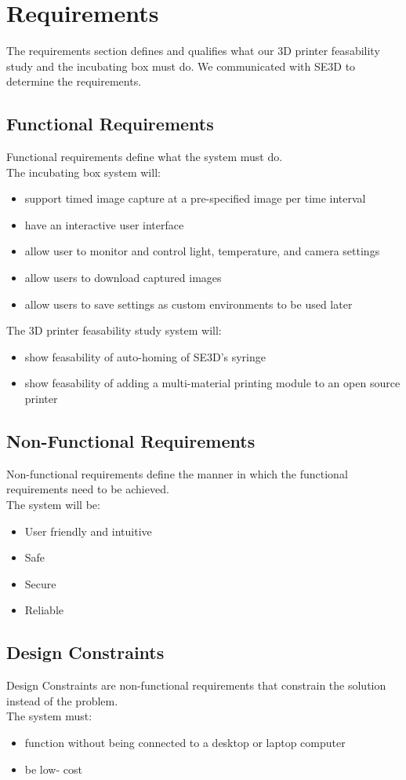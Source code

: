 \chapter{Requirements}

The requirements section defines and qualifies what our 3D printer feasability study and the incubating box must do. We communicated with SE3D to determine the requirements.

\section{Functional Requirements}

Functional requirements define what the system must do. \\
The incubating box system will:
\begin{itemize}
	\item support timed image capture at a pre-specified image per time interval
	\item have an interactive user interface
	\item allow user to monitor and control light, temperature, and camera settings
	\item allow users to download captured images
	\item allow users to save settings as custom environments to be used later
\end{itemize}


The 3D printer feasability study system will:
\begin{itemize}
	\item show feasability of auto-homing of SE3D's syringe 
	\item show feasability of adding a multi-material printing module to an open source printer
\end{itemize}

\section{Non-Functional Requirements}
Non-functional requirements define the manner in which the functional requirements need to be achieved. \\
The system will be:
\begin{itemize}
	\item User friendly and intuitive
	\item Safe
	\item Secure
	\item Reliable
\end{itemize} 


\section{Design Constraints}
Design Constraints are non-functional requirements that constrain the solution instead of the problem. \\
The system must:
\begin{itemize}
	\item function without being connected to a desktop or laptop computer
	\item be low- cost
\end{itemize}

